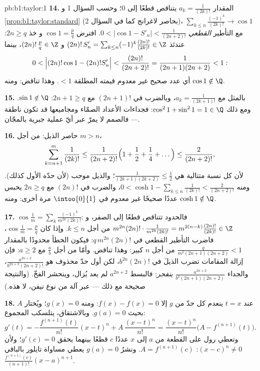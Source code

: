 \begin{solution}{pb:b1:taylor:1}
\textbf{14.} المقدار $a_k = \frac{1}{(2k)!}$ يتناقص قطعًا إلى $0$؛
وحسب السؤال 1 و \cref{prop:b1:taylor:standard} (بحاصر لاغرانج
كما في السؤال 2)، $\sum_{k \leq n}\frac{(-1)^k}{(2k)!}
\to \cos 1$ مع التأطير \emph{القطعي} $0 < \bigl|\cos 1 -
S'_n\bigr| < \frac{1}{(2n+2)!}$. افترض $\cos 1 = \frac pq$ و
خذ $2n \geq q$: عندئذ $(2n)!\,S'_n = \sum_{k\leq n} (-1)^k
\frac{(2n)!}{(2k)!} \in \Z$ و $(2n)!\,\frac pq \in \Z$، بينما
\[
0 < \Bigl|(2n)!\cos 1 - (2n)!S'_n\Bigr| <
\frac{(2n)!}{(2n+2)!} = \frac{1}{(2n+1)(2n+2)} < 1 :
\]
أي عدد صحيح غير معدوم قيمته المطلقة $< 1$. وهذا تناقض: ومنه $\cos
1 \notin \Q$.

\textbf{15.} بالمثل مع $a_k = \frac{1}{(2k+1)!}$،
وبالضرب في $(2n+1)!$ مع $2n + 1 \geq q$: $\sin 1 \notin
\Q$. ومع ذلك $\cos^2 1 + \sin^2 1 = 1 \in \Q$: فجداءات الأعداد
الصمّاء ومجاميعها قد تكون ناطقة --- فالصمم لا يمرّ عبر أيّ
عملية جبرية بالمجّان.

\textbf{16.} حاصر الذيل: من أجل $m > n$،
\[
\sum_{k=n+1}^{m} \frac{1}{(2k)!}
\leq \frac{1}{(2n+2)!}\Bigl(1 + \frac12 + \frac14 +
\dots\Bigr) \leq \frac{2}{(2n+2)!} ,
\]
لأن كل نسبة متتالية هي $\frac{1}{(2k+1)(2k+2)} \leq
\frac12$؛ والذيل موجب (لأن حدّه الأول كذلك). ومنه $0 <
\cosh 1 - \sum_{k\leq n}\frac{1}{(2k)!} < \frac{2}{(2n+2)!}$،
والضرب في $(2n)!$ مع $2n \geq q$ يحبس عددًا صحيحًا غير معدوم
في $\intoo{0}{1}$ مرة أخرى: ومنه $\cosh 1 \notin \Q$.

\textbf{17.} $\cos\frac1m = \sum_k
\frac{(-1)^k}{m^{2k}(2k)!}$: فالحدود تتناقص قطعًا إلى
الصفر، و $m^{2n}(2n)!\cdot\frac{1}{m^{2k}(2k)!} =
m^{2(n-k)}\frac{(2n)!}{(2k)!} \in \Z$ من أجل $k \leq n$. وإذا كان
$\cos\frac1m = \frac pq$، فاضرب التأطير القطعي في
$q\,m^{2n}(2n)!$: فيكون الخطأ محدودًا بالمقدار
$\frac{q}{m^2(2n+1)(2n+2)} < 1$ من أجل $n$ كبير: وهذا تناقض.
وأمّا من أجل $\frac ab$ مع $a \geq 2$: فإن إزالة المقامات تضرب
الذيلَ في $b^{2n}(2n)!$، لكن أول حدّ محذوف هو
$\frac{a^{2n+2}}{b^{2n+2}(2n+2)!}$، والجداء
$\frac{a^{2n+2}}{b^2(2n+1)(2n+2)}$ \emph{ينفجر}: فالبسط
$a^{2n+2}$ لم يعد يُزال، وينحشر الفخّ.
(والنتيجة صحيحة مع ذلك --- عبر آلة من نوع نيفن، لا هذه.)

\textbf{18.} عند $t = x$ ينعدم كل حدّ من $g$ إلا $f(x)
- f(x) = 0$: ومنه $g(x) = 0$؛ ويُختار $A$ بحيث $g(a) = 0$.
وبالاشتقاق، يتلسكب المجموع:
\[
g'(t) = -\frac{f^{(n+1)}(t)}{n!}(x - t)^n +
A\,\frac{(x-t)^n}{n!}
= \frac{(x-t)^n}{n!}\bigl(A - f^{(n+1)}(t)\bigr) .
\]
وتعطي رول على القطعة من $a$ إلى $x$ عددًا $c$ قطعًا بينهما
يحقق $g'(c) = 0$؛ ولأن $(x - c)^n \neq 0$: $A =
f^{(n+1)}(c)$. ونشرُ $g(a) = 0$ يعطي مساواة تايلور
بالباقي $\frac{f^{(n+1)}(c)}{(n+1)!}(x-a)^{n+1}$.


\end{solution}
